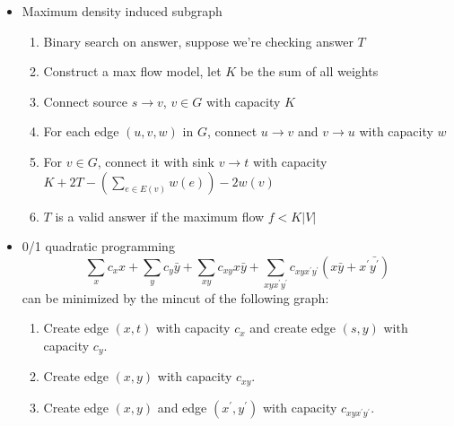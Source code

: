 \begin{itemize}
    \itemsep-0.3em
    \item Maximum density induced subgraph
    \vspace{-1em}
    \begin{enumerate}
        \itemsep-0.3em
        \item Binary search on answer, suppose we're checking answer $T$
        \item Construct a max flow model, let $K$ be the sum of all weights
        \item Connect source $s \rightarrow v$, $v \in G$ with capacity $K$
        \item For each edge $(u, v, w)$ in $G$, connect $u \rightarrow v$ and $v \rightarrow u$ with capacity $w$
        \item For $v \in G$, connect it with sink $v \rightarrow t$ with capacity $K + 2T - (\sum_{e \in E(v)}{w(e)}) - 2w(v)$
        \item $T$ is a valid answer if the maximum flow $f < K \lvert V \rvert$
    \end{enumerate}
    \item 0/1 quadratic programming
    \vspace{-1em}
    \[ \sum_x{c_xx} + \sum_y{c_y\bar{y}} + \sum_{xy}c_{xy}x\bar{y} + \sum_{xyx^\prime y^\prime}c_{xyx^\prime y^\prime}(x\bar{y} + x^\prime\bar{y^\prime}) \]
    can be minimized by the mincut of the following graph:
    \begin{enumerate}
      \itemsep-0.3em
      \item Create edge $(x, t)$ with capacity $c_x$ and create edge $(s, y)$ with capacity $c_y$.
      \item Create edge $(x, y)$ with capacity $c_{xy}$.
      \item Create edge $(x, y)$ and edge $(x^\prime, y^\prime)$ with capacity $c_{xyx^\prime y^\prime}$.
    \end{enumerate}
\end{itemize}
